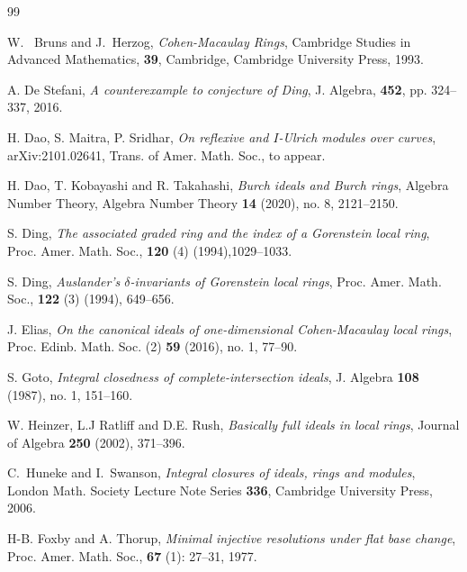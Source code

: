 \documentclass[a4paper,12pt]{amsart}
\theoremstyle{definition}
\theoremstyle{remark}
\numberwithin{equation}{section}
\begin{document}
\begin{thebibliography}{99}




 W.~ Bruns and J.~Herzog, \emph{Cohen-Macaulay Rings}, Cambridge Studies in Advanced Mathematics, {\bf 39}, Cambridge, Cambridge University Press, 1993.

 A. De Stefani, \emph{A counterexample to conjecture of Ding}, J. Algebra,  {\bf 452}, pp. 324--337, 2016.

{H. Dao, S. Maitra, P. Sridhar}, \emph{On reflexive and $I$-Ulrich modules over curves}, arXiv:2101.02641, Trans. of Amer. Math. Soc., to appear. 

{H. Dao, T. Kobayashi and R. Takahashi}, \emph{Burch ideals and Burch rings}, {Algebra Number Theory},  Algebra Number Theory  {\bf 14} (2020), no. 8, 2121–2150.




{S. Ding}, \emph{The associated graded ring and the index of a Gorenstein local ring},
Proc. Amer. Math. Soc., {\bf 120} (4) (1994),1029--1033.


{S. Ding}, \emph{Auslander’s $\delta$-invariants of Gorenstein local rings}, Proc. Amer. Math. Soc., {\bf 122} (3) (1994), 649--656. 



{J. Elias}, \emph{On the canonical ideals of one-dimensional Cohen-Macaulay local rings}, Proc. Edinb. Math. Soc. (2) {\bf 59} (2016), no. 1, 77–90.

{S. Goto}, \emph{Integral closedness of complete-intersection ideals}, J. Algebra {\bf108} (1987), no. 1, 151--160.


 {W. Heinzer, L.J Ratliff and D.E. Rush}, \emph{Basically full ideals in local rings}, Journal of Algebra {\bf 250} (2002), 371--396.


 C.~Huneke and I.~Swanson, \emph{Integral closures of ideals, rings and modules}, London Math. Society Lecture Note Series {\bf 336}, Cambridge University Press, 2006.








 H-B. Foxby and A. Thorup, \emph{Minimal injective resolutions under flat base change}, Proc. Amer. Math. Soc., {\bf 67} (1): 27--31, 1977.



\end{thebibliography}
\end{document}
